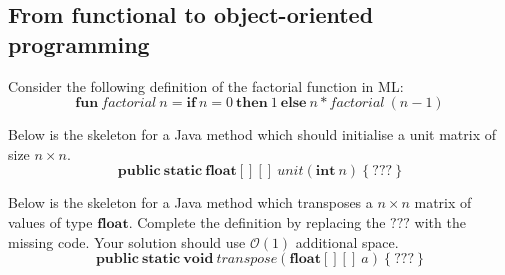 \documentclass[10pt,a4paper]{exam}
\begin{document}
\begin{questions}

\section*{From functional to object-oriented programming}

\question Consider the following definition of the factorial function in ML:
\begin{displaymath}
\mathbf{fun}~\mathit{factorial}~n = \mathbf{if}~n = 0~\mathbf{then}~1~\mathbf{else}~n * \mathit{factorial}~(n-1)
\end{displaymath}
\question Below is the skeleton for a Java method which should initialise a unit matrix of size $n \times n$. 
\begin{displaymath}
\mathbf{public}~\mathbf{static}~\mathbf{float}[][]~\mathit{unit}(\mathbf{int}~n)~\{~???~\}
\end{displaymath}
\question[4] Below is the skeleton for a Java method which transposes a $n \times n$ matrix of values of type $\mathbf{float}$. Complete the definition by replacing the $???$ with the missing code. Your solution should use $\mathcal{O}(1)$ additional space.
\begin{displaymath}
\mathbf{public}~\mathbf{static}~\mathbf{void}~\mathit{transpose}(\mathbf{float}[][]~a)~\{~???~\}
\end{displaymath} \droppoints 


\end{questions}
\end{document}
